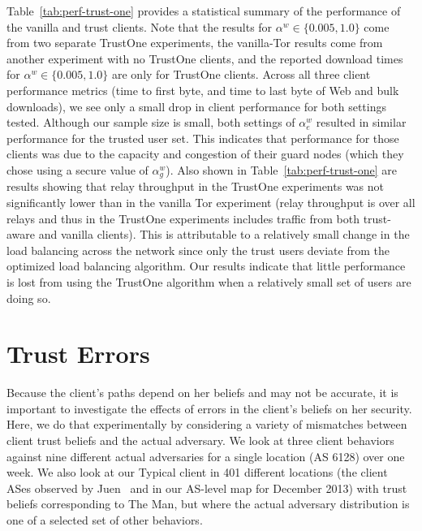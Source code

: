 \documentclass[conference]{styles/IEEEtran}
\begin{document}
Table~\ref{tab:perf-trust-one} provides a statistical summary of the performance of 
the vanilla and trust clients. Note that
the results for $\alpha^w\in \{0.005, 1.0\}$ come from two separate TrustOne experiments,
the vanilla-Tor results come from another experiment with no TrustOne clients, and
the reported download times for $\alpha^w\in \{0.005, 1.0\}$ are only for TrustOne clients.
Across all three client performance metrics (time to first byte, and
time to last byte of Web and bulk downloads), we see only a small drop
in client performance for both settings tested. Although our sample size is
small, both settings of $\alpha^w_e$ resulted in similar performance for the
trusted user set. This indicates that performance for those clients was due to
the capacity and congestion of their guard nodes (which they chose using a
secure value of $\alpha^w_g$). Also shown in Table~\ref{tab:perf-trust-one} are
results showing that relay throughput in the TrustOne experiments
was not significantly lower than in the vanilla Tor experiment
(relay throughput is over all relays and thus in the TrustOne experiments includes
traffic from both trust-aware and vanilla clients).
This is attributable to a relatively small change in the load balancing across
the network since only the trust users deviate from the optimized load balancing
algorithm. Our results indicate that little performance is lost from using the
TrustOne algorithm when a relatively small set of users are doing so.
 



\section{Trust Errors}\label{sec:errors}



























Because the client's paths depend on her beliefs and may not be accurate, it is important to investigate the effects of errors in the client's beliefs on her security.  Here, we do that experimentally by considering a variety of mismatches between client trust beliefs and the actual adversary.  We look at three client behaviors against nine different actual adversaries for a single location (AS 6128) over one week.  We also look at our Typical client in 401 different locations (the client ASes observed by Juen~\cite{juen-masters} and in our AS-level map for December 2013) with trust beliefs corresponding to \textsf{The Man}, but where the actual adversary distribution is one of a selected set of other behaviors.  
\end{document}

